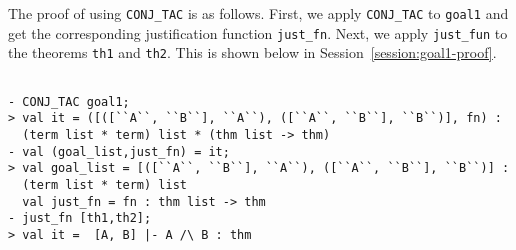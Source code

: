 The proof of  using \verb|CONJ_TAC| is as
follows.  First, we apply \texttt{CONJ\_TAC} to \texttt{goal1} and get
the corresponding justification function \verb|just_fn|.  Next, we
apply \verb|just_fun| to the theorems \texttt{th1} and
\texttt{th2}. This is shown below in
Session~\ref{session:goal1-proof}.
\begin{session}
  \label{session:goal1-proof}
  \begin{scriptsize}
\begin{verbatim}

- CONJ_TAC goal1;
> val it = ([([``A``, ``B``], ``A``), ([``A``, ``B``], ``B``)], fn) :
  (term list * term) list * (thm list -> thm)
- val (goal_list,just_fn) = it;
> val goal_list = [([``A``, ``B``], ``A``), ([``A``, ``B``], ``B``)] :
  (term list * term) list
  val just_fn = fn : thm list -> thm
- just_fn [th1,th2];
> val it =  [A, B] |- A /\ B : thm
\end{verbatim}
  \end{scriptsize}
\end{session}

